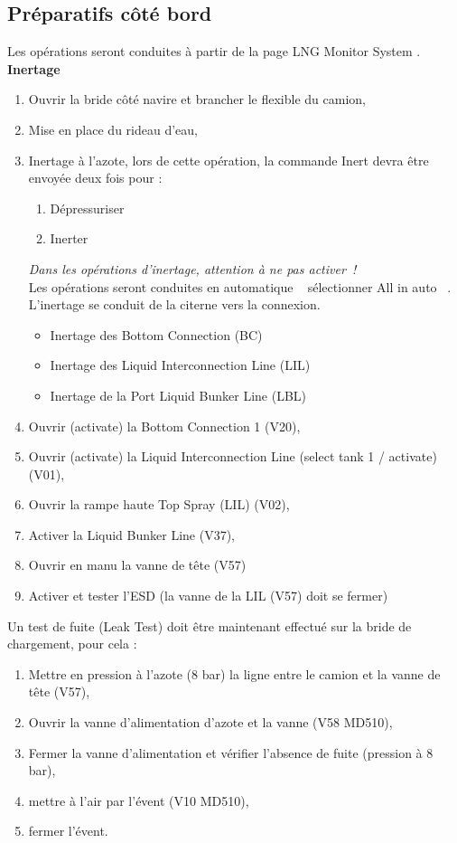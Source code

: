 \documentclass[12pt,a4paper]{article}
\newcommand{\gui}[1]
{\og #1 \fg~}
\begin{document}
 \subsection*{Préparatifs côté bord}
Les opérations seront conduites à partir de la page \og LNG Monitor System \fg.
\\
\textbf{Inertage}
\begin{enumerate}
 \item Ouvrir la bride côté navire et brancher le flexible du camion,
 \item Mise en place du rideau d'eau,
 \item Inertage à l'azote, lors de cette opération, la commande Inert devra être envoyée deux fois pour :
 \begin{enumerate}
  \item Dépressuriser
  \item Inerter
 \end{enumerate}

    \emph{Dans les opérations d'inertage, attention à ne pas \og activer~\fg !}\\
Les opérations seront conduites en \gui{automatique} sélectionner \gui{All in auto}. L'inertage se conduit de la citerne vers la connexion.
    \begin{itemize}
        \item Inertage des Bottom Connection (BC)
        \item Inertage des Liquid Interconnection Line (LIL)
        \item Inertage de la Port Liquid Bunker Line (LBL)
    \end{itemize}
 \item Ouvrir (activate) la Bottom Connection 1 (V20),
 \item Ouvrir (activate) la Liquid Interconnection Line (select tank 1 / activate) (V01),
 \item Ouvrir la rampe haute Top Spray (LIL) (V02),
 \item Activer la Liquid Bunker Line (V37),
 \item Ouvrir en manu la vanne de tête (V57)
 \item Activer et tester l'ESD (la vanne de la LIL (V57)  doit se fermer)
\end{enumerate}
Un test de fuite (Leak Test) doit être maintenant effectué sur la bride de chargement, pour cela :\\
\begin{enumerate}
\item Mettre en pression à l'azote (8 bar) la ligne entre le camion et la vanne de tête (V57), 
 
 \item Ouvrir la vanne d'alimentation d'azote et la vanne (V58 MD510),
 \item Fermer la vanne d'alimentation et vérifier l'absence de fuite (pression à 8 bar),
 \item mettre à l'air par l'évent (V10 MD510),
 \item fermer l'évent.
\end{enumerate}
\end{document}
